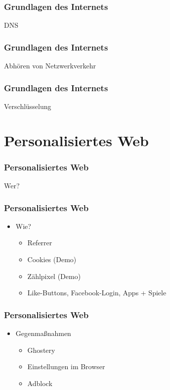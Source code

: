 \documentclass[12pt]{beamer}
\begin{document}
\begin{frame}
  \frametitle{Grundlagen des Internets}
  \begin{center} \Large
  DNS
  \end{center}
\end{frame}

\begin{frame}
  \frametitle{Grundlagen des Internets}
  \begin{center} \Large
  Abhören von Netzwerkverkehr
  \end{center}
\end{frame}

\begin{frame}
  \frametitle{Grundlagen des Internets}
  \begin{center} \Large
  Verschlüsselung
  \end{center}
\end{frame}

\section{Personalisiertes Web}

\begin{frame}
  \frametitle{Personalisiertes Web}
  \begin{center} \Large
  Wer?
  \end{center}
\end{frame}

\begin{frame}
  \frametitle{Personalisiertes Web}
  \begin{itemize}
    \item<1-> Wie?
      \begin{itemize}
        \item<2-> Referrer
        \item<3-> Cookies (Demo)
        \item<4-> Zählpixel (Demo)
        \item<5-> Like-Buttons, Facebook-Login, Apps + Spiele
      \end{itemize}
  \end{itemize}
\end{frame}

\begin{frame}
  \frametitle{Personalisiertes Web}
  \begin{itemize}
    \item<1-> Gegenmaßnahmen 
      \begin{itemize}
        \item<2-> Ghostery
        \item<3-> Einstellungen im Browser
        \item<4-> Adblock
      \end{itemize}
  \end{itemize}
\end{frame}
\end{document}
